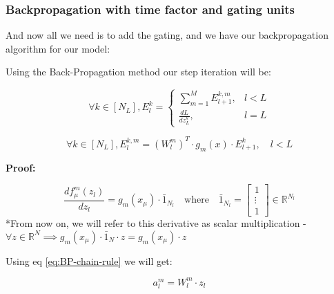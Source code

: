 \subsubsection{Backpropagation with time factor and gating units}

And now all we need is to add the gating, and we have our backpropagation algorithm for our model:

\begin{mdframed}[backgroundcolor=red_background, linecolor=black, linewidth=2pt, frametitle=\textbf{Statement}]
\begin{center}

    \label{st:BP-cross-entr-gating}
    Using the Back-Propagation method our step iteration will be:

    \begin{equation}
        \forall k \in [N_L], E_l^k = \begin{cases} \sum_{m=1}^M E_{l+1}^{k,m}, & l < L \\ \frac{dL}{dz_L^k}, & l = L \end{cases}
    \end{equation}

    \begin{equation}
        \forall k \in [N_L], E_l^{k,m} = (W_l^m)^T \cdot g_m(x) \cdot E_{l+1}^k, \quad l < L
    \end{equation}

\end{center}
\end{mdframed}

\textbf{Proof:}

\begin{equation}
\frac{df_\mu^m(z_l)}{dz_l} = g_m(x_\mu) \cdot \bar{1}_{N_l} \quad \text{where} \quad \bar{1}_{N_l} = \begin{bmatrix} 1 \\ \vdots \\ 1 \end{bmatrix} \in \mathbb{R}^{N_l}
\end{equation}
*From now on, we will refer to this derivative as scalar multiplication - \\
$\forall z \in \mathbb{R}^N \implies g_m(x_\mu) \cdot \bar{1}_N \cdot z = g_m(x_\mu) \cdot z$


Using eq \ref{eq:BP-chain-rule} we will get:

\begin{equation}
    a_l^m = W_l^m \cdot z_l
\end{equation}

